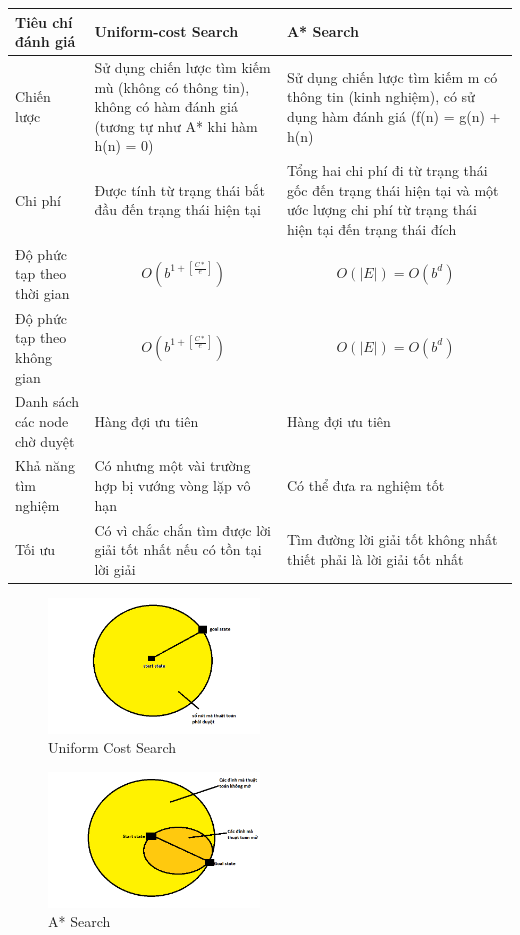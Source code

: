 \documentclass{article}
\begin{document}
\begin{center}
    \begin{tabular}{ | l | p{5cm} | p{5cm} |}
    \hline
    Tiêu chí đánh giá & Uniform-cost Search & A* Search\\ \hline
    Chiến lược & Sử dụng chiến lược tìm kiếm mù (không có thông tin), không có hàm đánh giá (tương tự như A* khi hàm h(n) = 0) & Sử dụng chiến lược tìm kiếm m có thông tin (kinh nghiệm), có sử dụng hàm đánh giá (f(n) = g(n) + h(n) \\ \hline
    Chi phí & Được tính từ trạng thái bắt đầu đến trạng thái hiện tại & Tổng hai chi phí đi từ trạng thái gốc đến trạng thái hiện tại và một ước lượng chi phí từ trạng thái hiện tại đến trạng thái đích  \\ \hline
    Độ phức tạp theo thời gian & $$O(b^{1 + [\frac{C*}{e}]})$$ & $$O(|E|) = O(b^{d})$$  \\\hline
    Độ phức tạp theo không gian & $$O(b^{1 + [\frac{C*}{e}]})$$  & $$O(|E|) = O(b^{d})$$ \\\hline
    Danh sách các node chờ duyệt & Hàng đợi ưu tiên & Hàng đợi ưu tiên \\\hline
    Khả năng tìm nghiệm & Có nhưng một vài trường hợp bị vướng vòng lặp vô hạn & Có thể đưa ra nghiệm tốt \\\hline
    Tối ưu & Có vì chắc chắn tìm được lời giải tốt nhất nếu có tồn tại lời giải & Tìm đường lời giải tốt không nhất thiết phải là lời giải tốt nhất  \\\hline
    \end{tabular}
    
\begin{figure}[H]
\centering
\includegraphics[width=0.5\textwidth]{ucs.png}
\caption{Uniform Cost Search}
\end{figure}

\begin{figure}[H]
\centering
\includegraphics[width=0.5\textwidth]{heuristic.png}
\caption{A* Search}
\end{figure}
\end{center}
\newpage
\end{document}
